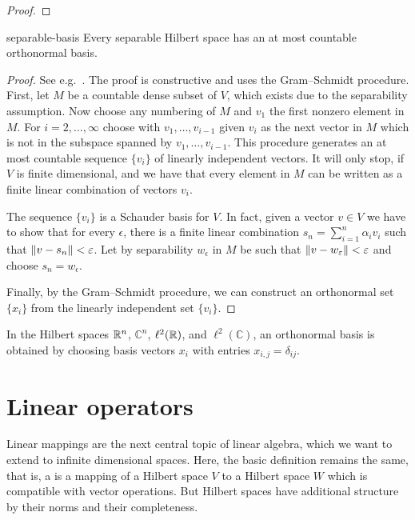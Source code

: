 \begin{todo}
  \begin{proof}
    
  \end{proof}
\end{todo}

\begin{Theorem}{separable-basis}
  Every separable Hilbert space has an at most countable orthonormal basis.
\end{Theorem}

\begin{proof}
  See e.g.~\cite{Yosida80}. The proof is constructive and uses the
  Gram--Schmidt procedure. First, let $M$ be a countable dense subset
  of $V$, which exists due to the separability assumption. Now choose
  any numbering of $M$ and $v_1$ the first nonzero element in
  $M$. For $i=2,\dots,\infty$ choose with $v_1,\dots,v_{i-1}$ given
  $v_i$ as the next vector in $M$ which is not in the subspace spanned
  by $v_1,\dots,v_{i-1}$. This procedure generates an at most
  countable sequence $\{v_i\}$ of linearly independent vectors. It
  will only stop, if $V$ is finite dimensional, and we have that every
  element in $M$ can be written as a finite linear combination of
  vectors $v_i$.
  
  The sequence $\{v_i\}$ is a Schauder basis for $V$. In fact, given a
  vector $v\in V$ we have to show that for every $\epsilon$, there is
  a finite linear combination $s_n = \sum_{i=1}^n \alpha_i v_i$ such
  that $\lVert v-s_n\rVert < \varepsilon$. Let by separability $w_\epsilon$ in $M$
  be such that $\lVert v-w_\varepsilon\rVert < \varepsilon$ and choose $s_n =
  w_\epsilon$.
  
  Finally, by the Gram--Schmidt procedure, we can construct an
  orthonormal set $\{x_i\}$ from the linearly independent set $\{v_i\}$.
\end{proof}

\begin{example}
  In the Hilbert spaces $\mathbb R^n$, $\mathbb C^n$, $\ell^2(\mathbb R)$, and
  $\ell^2(\mathbb C)$, an orthonormal basis is obtained by choosing
  basis vectors $x_i$ with entries $x_{i,j} = \delta_{ij}$.
\end{example}

\section{Linear operators}

\begin{intro}
  Linear mappings are the next central topic of linear algebra, which
  we want to extend to infinite dimensional spaces. Here, the basic
  definition remains the same, that is, a  is
  a mapping of a Hilbert space $V$ to a Hilbert space $W$ which is
  compatible with vector operations. But Hilbert spaces have
  additional structure by their norms and their completeness.
\end{intro}

